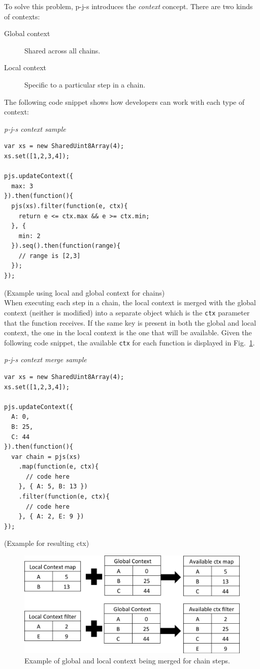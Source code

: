 \documentclass[runningheads,a4paper]{llncs}
\begin{document}
To solve this problem, p-j-s introduces the \emph{context} concept. There are two kinds of contexts:
\begin{description}
\item[Global context] Shared across all chains.
\item[Local context] Specific to a particular step in a chain.
\end{description}

The following code snippet shows how developers can work with each type of context:
\medskip

\noindent
{\it p-j-s context sample}
\begin{verbatim}
var xs = new SharedUint8Array(4);
xs.set([1,2,3,4]);

pjs.updateContext({
  max: 3
}).then(function(){
  pjs(xs).filter(function(e, ctx){
    return e <= ctx.max && e >= ctx.min;
  }, {
    min: 2
  }).seq().then(function(range){
    // range is [2,3]
  });
});

\end{verbatim}
%
\noindent
{\small (Example using local and global context for chains)}\\

When executing each step in a chain, the local context is merged with the global context (neither is modified) into a separate object which is the \verb+ctx+ parameter that the function receives. If the same key is present in both the global and local context, the one in the local context is the one that will be available. Given the following code snippet, the available \verb+ctx+ for each function is displayed in Fig.~\ref{fig:context}.
\medskip

\noindent
{\it p-j-s context merge sample}
\begin{verbatim}
var xs = new SharedUint8Array(4);
xs.set([1,2,3,4]);

pjs.updateContext({
  A: 0,
  B: 25,
  C: 44
}).then(function(){
  var chain = pjs(xs)
    .map(function(e, ctx){
      // code here
    }, { A: 5, B: 13 })
    .filter(function(e, ctx){
      // code here
    }, { A: 2, E: 9 })
});

\end{verbatim}
%
\noindent
{\small (Example for resulting ctx)}\\

\begin{figure}
\centering
\includegraphics[width=1\textwidth]{context}
\caption{Example of global and local context being merged for chain steps.}
\label{fig:context}
\end{figure}
\end{document}
